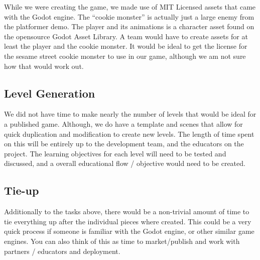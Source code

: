 \documentclass{article}
\begin{document}
While we were creating the game, we made use of MIT Licensed assets
that came with the Godot engine. The ``cookie monster'' is actually
just a large enemy from the platformer demo. The player and its animations 
is a character asset found on the opensource Godot Asset Library. A team would have to create assets for at least the 
player and the cookie monster. It would be ideal to get the license 
for the sesame street cookie monster to use in our game, although we am not sure how that
would work out.

\subsection{Level Generation}

We did not have time to make nearly the number of levels that would be
ideal for a published game. Although, we do have a template and scenes that allow for quick duplication and modification to
create new levels. The length of time spent on this will be entirely
up to the development team, and the educators on the project. 
The learning objectives for each level will need to be tested and discussed,
and a overall educational flow / objective would need to be created.
\subsection{Tie-up}

Additionally to the tasks above, there would be a non-trivial amount
of time to tie everything up after the individual pieces where
created. This could be a very quick process if someone is familiar
with the Godot engine, or other similar game engines. You can also
think of this as time to market/publish and work with partners / educators and
deployment.
\end{document}
